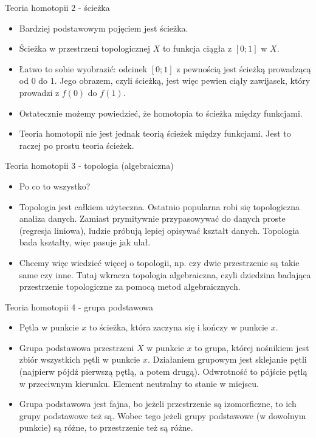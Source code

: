 \documentclass{beamer}
\begin{document}
\begin{frame}{Teoria homotopii 2 - ścieżka}
\begin{itemize}
	\item Bardziej podstawowym pojęciem jest ścieżka.
	\item Ścieżka w przestrzeni topologicznej $X$ to funkcja ciągła z $[0; 1]$ w $X$.
	\item Łatwo to sobie wyobrazić: odcinek $[0; 1]$ z pewnością jest ścieżką prowadzącą od $0$ do $1$. Jego obrazem, czyli ścieżką, jest więc pewien ciąły zawijasek, który prowadzi z $f(0)$ do $f(1)$.
	\item Ostatecznie możemy powiedzieć, że homotopia to ścieżka między funkcjami.
	\item Teoria homotopii nie jest jednak teorią ścieżek między funkcjami. Jest to raczej po prostu teoria ścieżek.
\end{itemize}
\end{frame}

\begin{frame}{Teoria homotopii 3 - topologia (algebraiczna)}
\begin{itemize}
	\item Po co to wszystko?
	\item Topologia jest całkiem użyteczna. Ostatnio popularna robi się topologiczna analiza danych. Zamiast prymitywnie przypasowywać do danych proste (regresja liniowa), ludzie próbują lepiej opisywać kształt danych. Topologia bada kształty, więc pasuje jak ulał.
	\item Chcemy więc wiedzieć więcej o topologii, np. czy dwie przestrzenie są takie same czy inne. Tutaj wkracza topologia algebraiczna, czyli dziedzina badająca przestrzenie topologiczne za pomocą metod algebraicznych.
\end{itemize}
\end{frame}

\begin{frame}{Teoria homotopii 4 - grupa podstawowa}
\begin{itemize}
	\item Pętla w punkcie $x$ to ścieżka, która zaczyna się i kończy w punkcie $x$.
	\item Grupa podstawowa przestrzeni $X$ w punkcie $x$ to grupa, której nośnikiem jest zbiór wszystkich pętli w punkcie $x$. Działaniem grupowym jest sklejanie pętli (najpierw pójdź pierwszą pętlą, a potem drugą). Odwrotność to pójście pętlą w przeciwnym kierunku. Element neutralny to stanie w miejscu.
	\item Grupa podstawowa jest fajna, bo jeżeli przestrzenie są izomorficzne, to ich grupy podstawowe też są. Wobec tego jeżeli grupy podstawowe (w dowolnym punkcie) są różne, to przestrzenie też są różne.
\end{itemize}
\end{frame}
\end{document}
